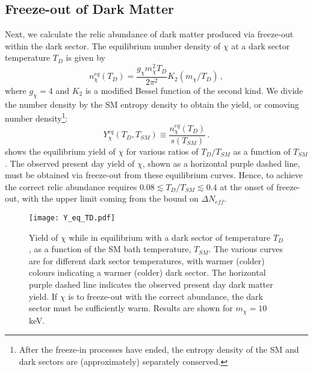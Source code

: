 \documentclass[aps, prd, reprint, nofootinbib, amsmath, amssymb, floatfix]{revtex4-2}
\begin{document}

\subsection{Freeze-out of Dark Matter}\label{sec:production_FO}

Next, we calculate the relic abundance of dark matter produced via freeze-out within the dark sector. The equilibrium number density of $\chi$ at a dark sector temperature $T_D$ is given by
%
\begin{equation}\label{eq:n_eq}
    n_\chi^{eq}\left(T_D\right) = \frac{g_\chi m_\chi^2 T_D}{2 \pi^2} K_2\left(m_\chi/T_D\right) \,,
\end{equation}
%
where $g_\chi = 4$ and $K_2$ is a modified Bessel function of the second kind. We divide the number density by the SM entropy density to obtain the yield, or comoving number density\footnote{After the freeze-in processes have ended, the entropy density of the SM and dark sectors are (approximately) separately conserved.}:
%
\begin{equation}\label{eq:Yield}
    Y^{eq}_\chi\left(T_D,T_{SM}\right) \equiv \frac{n^{eq}_\chi(T_D)}{s(T_{SM})} \,.
\end{equation}
%
 shows the equilibrium yield of $\chi$ for various ratios of $T_D/T_{SM}$ as a function of $T_{SM}$. The observed present day yield of $\chi$, shown as a horizontal purple dashed line, must be obtained via freeze-out from these equilibrium curves. Hence, to achieve the correct relic abundance requires $0.08 \lesssim T_D/T_{SM} \lesssim 0.4$ at the onset of freeze-out, with the upper limit coming from the bound on $\Delta N_{eff}$. 

\begin{figure}
    \texttt{[image: Y\_eq\_TD.pdf]}
    \caption{\label{fig:Y_eq_TD} Yield of $\chi$ while in equilibrium with a dark sector of temperature $T_D$, as a function of the SM bath temperature, $T_{SM}$. The various curves are for different dark sector temperatures, with warmer (colder) colours indicating a warmer (colder) dark sector. The horizontal purple dashed line indicates the observed present day dark matter yield. If $\chi$ is to freeze-out with the correct abundance, the dark sector must be sufficiently warm. Results are shown for $m_\chi = 10$\,keV.}
\end{figure}
\end{document}
